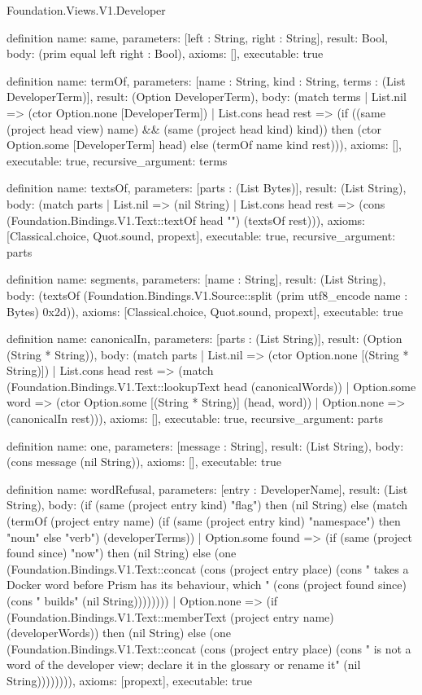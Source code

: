 \begin{lexlean}{Foundation.Views.V1.Developer}
\begin{semanticmodule}
definition{
  name: same,
  parameters: [left : String, right : String],
  result: Bool,
  body: (prim equal left right : Bool),
  axioms: [],
  executable: true
}

definition{
  name: termOf,
  parameters: [name : String, kind : String, terms : (List DeveloperTerm)],
  result: (Option DeveloperTerm),
  body: (match terms
    | List.nil => (ctor Option.none [DeveloperTerm])
    | List.cons head rest => (if ((same (project head view) name) && (same (project head kind) kind)) then (ctor Option.some [DeveloperTerm] head) else (termOf name kind rest))),
  axioms: [],
  executable: true,
  recursive_argument: terms
}

definition{
  name: textsOf,
  parameters: [parts : (List Bytes)],
  result: (List String),
  body: (match parts
    | List.nil => (nil String)
    | List.cons head rest => (cons (Foundation.Bindings.V1.Text::textOf head "") (textsOf rest))),
  axioms: [Classical.choice, Quot.sound, propext],
  executable: true,
  recursive_argument: parts
}

definition{
  name: segments,
  parameters: [name : String],
  result: (List String),
  body: (textsOf (Foundation.Bindings.V1.Source::split (prim utf8_encode name : Bytes) 0x2d)),
  axioms: [Classical.choice, Quot.sound, propext],
  executable: true
}

definition{
  name: canonicalIn,
  parameters: [parts : (List String)],
  result: (Option (String * String)),
  body: (match parts
    | List.nil => (ctor Option.none [(String * String)])
    | List.cons head rest => (match (Foundation.Bindings.V1.Text::lookupText head (canonicalWords))
      | Option.some word => (ctor Option.some [(String * String)] (head, word))
      | Option.none => (canonicalIn rest))),
  axioms: [],
  executable: true,
  recursive_argument: parts
}

definition{
  name: one,
  parameters: [message : String],
  result: (List String),
  body: (cons message (nil String)),
  axioms: [],
  executable: true
}

definition{
  name: wordRefusal,
  parameters: [entry : DeveloperName],
  result: (List String),
  body: (if (same (project entry kind) "flag") then (nil String) else (match (termOf (project entry name) (if (same (project entry kind) "namespace") then "noun" else "verb") (developerTerms))
    | Option.some found => (if (same (project found since) "now") then (nil String) else (one (Foundation.Bindings.V1.Text::concat (cons (project entry place) (cons " takes a Docker word before Prism has its behaviour, which " (cons (project found since) (cons " builds" (nil String))))))))
    | Option.none => (if (Foundation.Bindings.V1.Text::memberText (project entry name) (developerWords)) then (nil String) else (one (Foundation.Bindings.V1.Text::concat (cons (project entry place) (cons " is not a word of the developer view; declare it in the glossary or rename it" (nil String)))))))),
  axioms: [propext],
  executable: true
}


\end{semanticmodule}
\end{lexlean}
